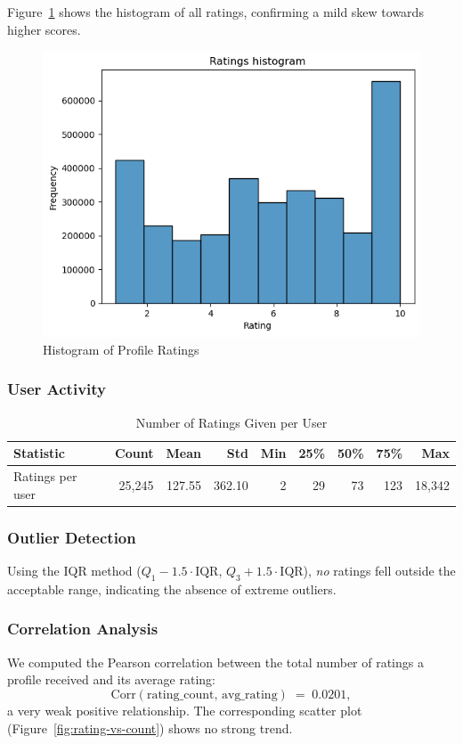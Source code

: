 Figure~\ref{fig:hist-rating} shows the histogram of all ratings, confirming a mild skew towards higher scores.

\begin{figure}[H]
  \centering
  \includegraphics[width=0.6\linewidth]{figures/hist.png}
  \caption{Histogram of Profile Ratings}
  \label{fig:hist-rating}
\end{figure}

\subsubsection*{User Activity}
\begin{table}[H]
    \centering
    \caption{Number of Ratings Given per User}
    \label{tab:user-stats}
    \begin{tabular}{@{}lrrrrrrrr@{}}
    \toprule
    Statistic        & Count    & Mean    & Std     & Min & 25\% & 50\% & 75\%   & Max     \\ 
    \midrule
    Ratings per user & 25{,}245 & 127.55  & 362.10  & 2   & 29   & 73   & 123    & 18{,}342 \\
    \bottomrule
    \end{tabular}
\end{table}


\subsubsection*{Outlier Detection}
Using the IQR method ($Q_1 - 1.5\cdot\mathrm{IQR}$, $Q_3 + 1.5\cdot\mathrm{IQR}$), \emph{no} ratings fell outside the acceptable range, indicating the absence of extreme outliers.

\subsubsection*{Correlation Analysis}
We computed the Pearson correlation between the total number of ratings a profile received and its average rating:
\[
  \mathrm{Corr}(\text{rating\_count},\,\text{avg\_rating})
  \;=\;0.0201,
\]
a very weak positive relationship. The corresponding scatter plot (Figure~\ref{fig:rating-vs-count}) shows no strong trend.

